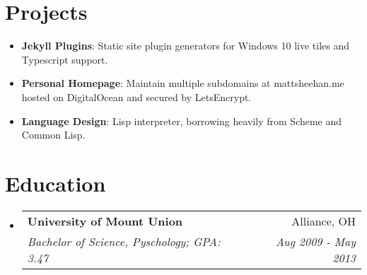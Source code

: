 \documentclass[letterpaper,11pt]{article}
\makeatletter
\newcommand{\resumeItem}[2]{
  \item\small{
    \textbf{#1}{: #2 \vspace{-2pt}}
  }
}
\newcommand{\resumeSubheading}[4]{
  \vspace{-1pt}\item
    \begin{tabular*}{0.97\textwidth}[t]{l@{\extracolsep{\fill}}r}
      \textbf{#1} & #2 \\
      \textit{\small#3} & \textit{\small #4} \\
    \end{tabular*}\vspace{-5pt}
}
\newcommand{\resumeSubItem}[2]{\resumeItem{#1}{#2}\vspace{-4pt}}
\newcommand{\resumeSubHeadingListStart}{\begin{itemize}[leftmargin=*]}
\newcommand{\resumeSubHeadingListEnd}{\end{itemize}}
\makeatother
\begin{document}
\section{Projects}
  \resumeSubHeadingListStart
    \resumeSubItem{Jekyll Plugins}
      {Static site plugin generators for Windows 10 live tiles and Typescript support.}
    \resumeSubItem{Personal Homepage}
      {Maintain multiple subdomains at mattsheehan.me hosted on DigitalOcean and secured by LetsEncrypt.}
    \resumeSubItem{Language Design}
      {Lisp interpreter, borrowing heavily from Scheme and Common Lisp.}
  \resumeSubHeadingListEnd


\section{Education}
  \resumeSubHeadingListStart
    \resumeSubheading
      {University of Mount Union}{Alliance, OH}
      {Bachelor of Science, Pyschology;  GPA: 3.47}{Aug 2009 - May 2013}
  \resumeSubHeadingListEnd


%
%

\end{document}

